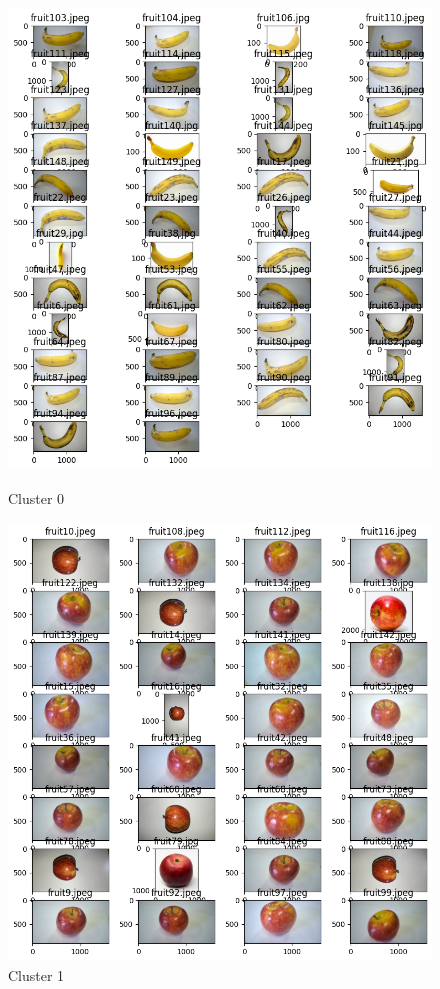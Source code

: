 \documentclass[a4paper, 12pt]{article}
\begin{document}
\begin{figure}[!htbp]
    \begin{minipage}[t]{0.5\textwidth}
        \centering
        \includegraphics[width=0.8\linewidth]{cluster0.png}
        \caption{Cluster 0}
        \label{cluster0}
    \end{minipage}%
    \begin{minipage}[t]{0.5\textwidth}
        \centering
        \includegraphics[width=0.8\linewidth]{cluster1.png}
        \caption{Cluster 1}
        \label{cluster1}
    \end{minipage}
\end{figure}
\end{document}
